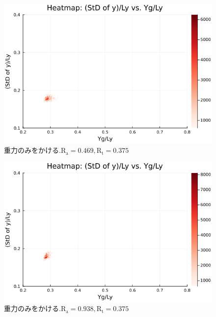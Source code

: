 \begin{figure}[H]
  \centering
  \includegraphics[scale=0.6]{image/dT0_heat/2024-01-15T14:30:47.945_mapg0_chi0_Ay50_rho0.4_T0.43_dT0.0_Rd0.0_Rt0.375_Ra0.4693845_g0.0003999718779659611_run4.0e7.png}
  \caption{$重力のみをかける. \text{R}_\text{a}=0.469,\text{R}_\text{t}=0.375$}
  \label{}
\end{figure}

\begin{figure}[H]
  \centering
  \includegraphics[scale=0.6]{image/dT0_heat/2024-01-15T14:30:48.012_mapg0_chi0_Ay50_rho0.4_T0.43_dT0.0_Rd0.0_Rt0.375_Ra0.938769_g0.0003999718779659611_run4.0e7.png}
  \caption{$重力のみをかける. \text{R}_\text{a}=0.938,\text{R}_\text{t}=0.375$}
  \label{}
\end{figure}

